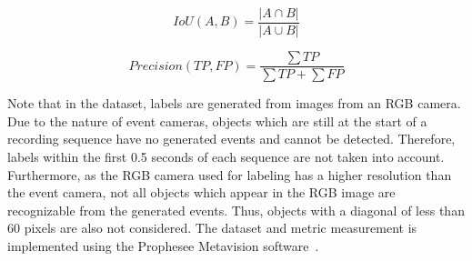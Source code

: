 \begin{equation} \label{eq:iou}
    IoU(A,B) = \frac{|A\cap B|}{|A\cup B|}
\end{equation}

\begin{equation} \label{eq:precision}
    Precision(TP,FP) = \frac{\sum TP}{\sum TP + \sum FP}
\end{equation}



Note that in the dataset, labels are generated from images from an RGB camera. Due to the nature of event cameras, objects which are still at the start of a recording sequence have no generated events and cannot be detected. Therefore, labels within the first 0.5 seconds of each sequence are not taken into account. Furthermore, as the RGB camera used for labeling has a higher resolution than the event camera, not all objects which appear in the RGB image are recognizable from the generated events. Thus, objects with a diagonal of less than 60 pixels are also not considered. The dataset and metric measurement is implemented using the Prophesee Metavision software~\cite{metavision}.




